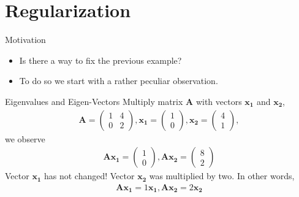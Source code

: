 \documentclass[notes]{beamer}
\begin{document}
  \section{Regularization}

  \begin{frame}{Motivation}
    \begin{itemize}
      \item Is there a way to fix the previous example?
      \item To do so we start with a rather peculiar observation.
    \end{itemize}
  \end{frame}

  \begin{frame}{Eigenvalues and Eigen-Vectors}
    Multiply matrix $\mathbf{A}$ with vectors $\mathbf{x_1}$ and $\mathbf{x_2}$,
    \begin{align}
      \mathbf{A} = \begin{pmatrix}
        1 & 4 \\
        0 & 2 
      \end{pmatrix},
      \mathbf{x_1} = \begin{pmatrix}
        1 \\ 0
      \end{pmatrix},
        \mathbf{x_2} = \begin{pmatrix}
          4 \\
          1
     \end{pmatrix},
    \end{align}
    we observe
    \begin{align}
      \mathbf{A}\mathbf{x_1} = \begin{pmatrix}
        1 \\ 0
      \end{pmatrix},
      \mathbf{A}\mathbf{x_2} = \begin{pmatrix}
        8 \\ 2
      \end{pmatrix}
    \end{align}
    Vector $\mathbf{x_1}$ has not changed! Vector $\mathbf{x_2}$ was multiplied by two.
    In other words,
    \begin{align}
      \mathbf{A}\mathbf{x_1} = 1 \mathbf{x_1}, \mathbf{A}\mathbf{x_2} = 2 \mathbf{x_2} 
    \end{align}
  \end{frame}
\end{document}
